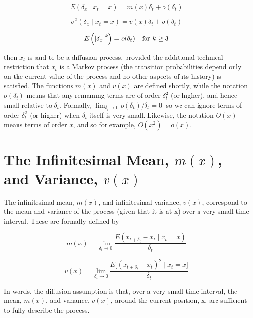 \documentclass{article}
\begin{document}
\begin{equation}
E\left(\delta_{x}\mid x_{t}=x\right)=m(x)\delta_{t}+o(\delta_{t})
\end{equation}

\begin{equation}
\sigma^{2}(\delta_{x}\mid x_{t}=x)=v(x)\delta_{t}+o(\delta_{t})
\end{equation}

\begin{equation}
\begin{array}{r l}{E\left(\left|\delta_{x}\right|^{k}\right)=o(\delta_{t})}&{{}\mathrm{f o r~}k\geq3}\end{array}
\end{equation}

then $x_t$ is said to be a diffusion process, provided the additional technical restriction that $x_t$ is a Markov process (the transition probabilities depend only on the current value of the process and no other aspects of its history) is satisfied. The functions $m(x)$ and $v(x)$ are defined shortly, while the notation $o(\delta_t)$ means that any remaining terms are of order $\delta_t^2$ (or higher), and hence small relative to $\delta_t$. Formally, $\lim_{\delta_t \to 0} o(\delta_t)/\delta_t = 0$, so we can ignore terms of order $\delta_t^2$ (or higher) when $\delta_t$ itself is very small. Likewise, the notation $O(x)$ means terms of order $x$, and so for example, $O(x^2) = o(x)$.

\section{The Infinitesimal Mean,  $ m(x) $, and Variance,  $ v(x) $}
The infinitesimal mean,  $ m(x) $, and infinitesimal variance,  $ v(x) $, correspond to the mean and variance of the process (given that it is at x) over a very small time interval. These are formally defined by

\begin{equation}
m(x)=\lim_{\delta_{t}\to0}\frac{E\left(x_{t+\delta_{t}}-x_{t}\mid x_{t}=x\right)}{\delta_{t}}
\end{equation}

\begin{equation}
v(x)=\lim_{\delta_{t}\to0}\frac{E\big[\left(x_{t+\delta_{t}}-x_{t}\right)^{2}\mid x_{t}=x\big]}{\delta_{t}}
\end{equation}

In words, the diffusion assumption is that, over a very small time interval, the mean,  $ m(x) $, and variance,  $ v(x) $, around the current position, x, are sufficient to fully describe the process.
\end{document}
